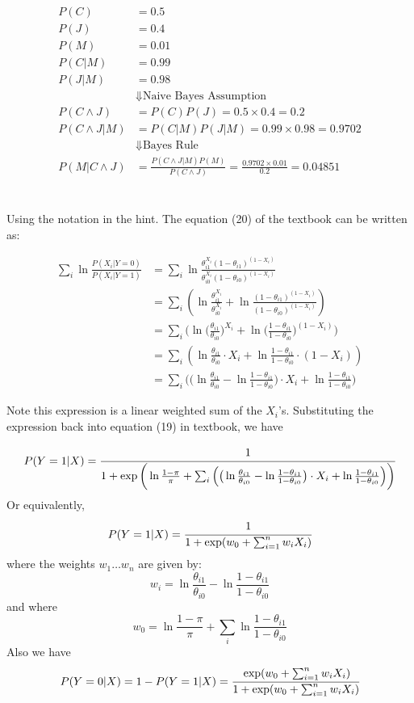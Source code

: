 \documentclass[12pt, letterpaper]{article}
\begin{document}
\begin{align*}
P(C)&=0.5\\
P(J)&=0.4\\
P(M)&=0.01\\
P(C|M)&=0.99\\
P(J|M)&=0.98\\
&\Downarrow\text{Naive Bayes Assumption}\\
P(C \land J)&=P(C)P(J)=0.5\times0.4=0.2\\
P(C \land J | M)&=P(C | M)P(J | M)=0.99\times0.98=0.9702\\
&\Downarrow\text{Bayes Rule}\\
P(M|C\land J)&=\frac{P(C\land J | M)P(M)}{P(C \land J)}=\frac{0.9702\times0.01}{0.2}=0.04851
\end{align*}

\section{}

Using the notation in the hint. The equation (20) of the textbook can be
written as:

\begin{align*}
\sum_i\ln\frac{P(X_i|Y=0)}{P(X_i|Y=1)}
&=\sum_i\ln\frac{\theta_{i1}^{X_i}(1-\theta_{i1})^{(1-X_i)}}{\theta_{i0}^{X_i}(1-\theta_{i0})^{(1-X_i)}}\\
&=\sum_i\left(\ln\frac{\theta_{i1}^{X_i}}{\theta_{i0}^{X_i}}+\ln\frac{(1-\theta_{i1})^{(1-X_i)}}{(1-\theta_{i0})^{(1-X_i)}}\right)\\
&=\sum_i\Bigg(\ln\bigg(\frac{\theta_{i1}}{\theta_{i0}}\bigg)^{X_i}+\ln\bigg(\frac{1-\theta_{i1}}{1-\theta_{i0}}\bigg)^{(1-X_i)}\Bigg)\\
&=\sum_i\left(\ln\frac{\theta_{i1}}{\theta_{i0}}\cdot{X_i}+\ln\frac{1-\theta_{i1}}{1-\theta_{i0}}\cdot{(1-X_i)}\right)\\
&=\sum_i\Bigg(\bigg(\ln\frac{\theta_{i1}}{\theta_{i0}}-\ln\frac{1-\theta_{i1}}{1-\theta_{i0}}\bigg)\cdot{X_i}+\ln\frac{1-\theta_{i1}}{1-\theta_{i0}}\Bigg)
\end{align*}

Note this expression is a linear weighted sum of the $X_i$'s. Substituting
the expression back into equation (19) in textbook, we have

\[P(Y=1|X)=\cfrac{1}{1+\exp\bigg(\ln\frac{1-\pi}{\pi}+\sum_i\Big(\big(\ln\frac{\theta_{i1}}{\theta_{i0}}-\ln\frac{1-\theta_{i1}}{1-\theta_{i0}}\big)\cdot{X_i}+\ln\frac{1-\theta_{i1}}{1-\theta_{i0}}\Big)\bigg)}\]
Or equivalently,
\[P(Y=1|X)=\cfrac{1}{1+\exp(w_0+\sum_{i=1}^nw_iX_i)}\]
where the weights $w_1\ldots w_n$ are given by:
\[w_i=\ln\frac{\theta_{i1}}{\theta_{i0}}-\ln\frac{1-\theta_{i1}}{1-\theta_{i0}}\]
and where
\[w_0=\ln\frac{1-\pi}{\pi}+\sum_i\ln\frac{1-\theta_{i1}}{1-\theta_{i0}}\]
Also we have
\[P(Y=0|X)=1-P(Y=1|X)=\cfrac{\exp(w_0+\sum_{i=1}^nw_iX_i)}{1+\exp(w_0+\sum_{i=1}^nw_iX_i)}\]
\end{document}
